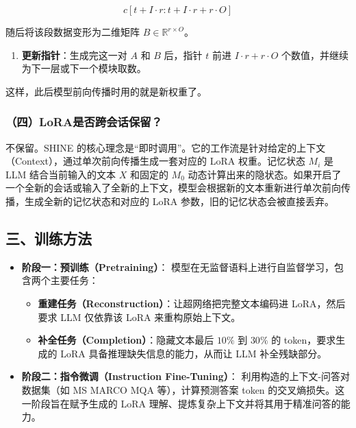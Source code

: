 \[
c[t+I\cdot r:t+I\cdot r+r\cdot O]
\]

随后将该段数据变形为二维矩阵 \(B\in\mathbb{R}^{r\times O}\)。

\begin{enumerate}
\def\labelenumi{\arabic{enumi}.}
\setcounter{enumi}{4}
\tightlist
\item
  \textbf{更新指针}：生成完这一对 \(A\) 和 \(B\) 后，指针 \(t\) 前进 \(I\cdot r+r\cdot O\) 个数值，并继续为下一层或下一个模块取数。
\end{enumerate}

这样，此后模型前向传播时用的就是新权重了。

\hypertarget{ux56dbloraux662fux5426ux8de8ux4f1aux8bddux4fddux7559}{%
\subsubsection{（四）LoRA是否跨会话保留？}\label{ux56dbloraux662fux5426ux8de8ux4f1aux8bddux4fddux7559}}

不保留。SHINE 的核心理念是``即时调用''。它的工作流是针对给定的上下文（Context），通过单次前向传播生成一套对应的 LoRA 权重。记忆状态 \(M_i\) 是 LLM 结合当前输入的文本 \(X\) 和固定的 \(M_0\) 动态计算出来的隐状态。如果开启了一个全新的会话或输入了全新的上下文，模型会根据新的文本重新进行单次前向传播，生成全新的记忆状态和对应的 LoRA 参数，旧的记忆状态会被直接丢弃。

\hypertarget{ux4e09ux8badux7ec3ux65b9ux6cd5}{%
\subsection{三、训练方法}\label{ux4e09ux8badux7ec3ux65b9ux6cd5}}

\begin{itemize}
\tightlist
\item
  \textbf{阶段一：预训练（Pretraining）}：
  模型在无监督语料上进行自监督学习，包含两个主要任务：

  \begin{itemize}
  \tightlist
  \item
    \textbf{重建任务（Reconstruction）}：让超网络把完整文本编码进 LoRA，然后要求 LLM 仅依靠该 LoRA 来重构原始上下文。
  \item
    \textbf{补全任务（Completion）}：隐藏文本最后 \(10\%\) 到 \(30\%\) 的 token，要求生成的 LoRA 具备推理缺失信息的能力，从而让 LLM 补全残缺部分。
  \end{itemize}
\item
  \textbf{阶段二：指令微调（Instruction Fine-Tuning）}：
  利用构造的上下文-问答对数据集（如 MS MARCO MQA 等），计算预测答案 token 的交叉熵损失。这一阶段旨在赋予生成的 LoRA 理解、提炼复杂上下文并将其用于精准问答的能力。
\end{itemize}

